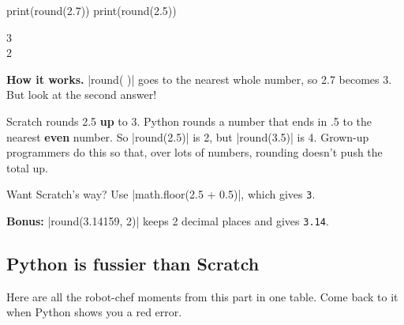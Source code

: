 \begin{tcbraster}[raster columns=2, raster equal height=rows, raster column skip=12pt, raster valign=center, raster force size=false, raster odd column/.style={add to width=-1.2cm}, raster even column/.style={add to width=1.2cm}]
\begin{tcolorbox}[colback=white, colframe=white, boxrule=0pt, valign=center]
\begin{scratch}
\end{scratch}
\end{tcolorbox}
\begin{tcolorbox}[colback=white, colframe=white, boxrule=0pt, left=0pt, right=0pt, top=0pt, bottom=0pt, valign=center]
\begin{code}
print(round(2.7))
print(round(2.5))
\end{code}
\begin{outputbox}
3\\
2
\end{outputbox}
\end{tcolorbox}
\end{tcbraster}

\textbf{How it works.} \py|round( )| goes to the nearest whole number, so 2.7 becomes 3. But look at the second answer!

\begin{watchout}
Scratch rounds 2.5 \textbf{up} to 3. Python rounds a number that ends in .5 to the nearest \textbf{even} number. So \py|round(2.5)| is 2, but \py|round(3.5)| is 4. Grown-up programmers do this so that, over lots of numbers, rounding doesn't push the total up.

Want Scratch's way? Use \py|math.floor(2.5 + 0.5)|, which gives \texttt{3}.

\textbf{Bonus:} \py|round(3.14159, 2)| keeps 2 decimal places and gives \texttt{3.14}.
\end{watchout}

\subsection*{Python is fussier than Scratch}

Here are all the robot-chef moments from this part in one table. Come back to it when Python shows you a red error.

